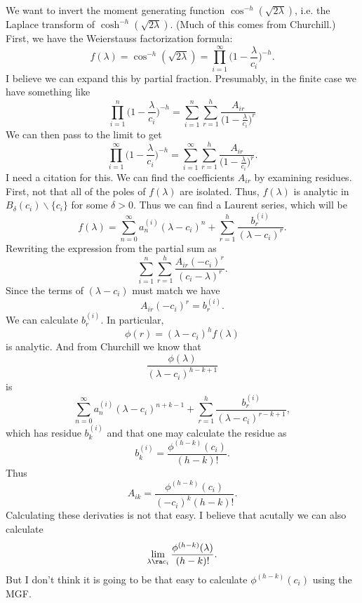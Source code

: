 \documentclass[12pt]{article}
\begin{document}
We want to invert the moment generating function $\cos^{-h}(\sqrt{2\lambda})$,
i.e. the Laplace transform of $\cosh^{-h}(\sqrt{2 \lambda})$.  (Much of this
comes from Churchill.)  First, we have the Weierstauss factorization formula:
\[
f(\lambda) = \cos^{-h}(\sqrt{2 \lambda}) = \prod_{i=1}^\infty \Big(1 -
\frac{\lambda}{c_i}\Big)^{-h}.
\]
I believe we can expand this by partial fraction.  Presumably, in the finite
case we have something like
\[
\prod_{i=1}^n \Big(1 - \frac{\lambda}{c_i}\Big)^{-h} = \sum_{i=1}^n \sum_{r=1}^h
\frac{A_{ir}}{\Big(1 - \frac{\lambda}{c_i}\Big)^{r}}
\]
We can then pass to the limit to get
\[
\prod_{i=1}^\infty \Big(1 - \frac{\lambda}{c_i}\Big)^{-h} = \sum_{i=1}^\infty \sum_{r=1}^h
\frac{A_{ir}}{\Big(1 - \frac{\lambda}{c_i}\Big)^r}.
\]
I need a citation for this.  We can find the coefficients $A_{ir}$ by examining
residues.  First, not that all of the poles of $f(\lambda)$ are isolated.  Thus,
$f(\lambda)$ is analytic in $B_{\delta}(c_i) \backslash \{c_i\}$ for some
$\delta > 0$.  Thus we can find a Laurent series, which will be
\[
f(\lambda) = \sum_{n=0}^\infty a_n^{(i)} (\lambda - c_i)^n + \sum_{r=1}^h
\frac{b_r^{(i)}}{(\lambda - c_i)^{r}}.
\]
Rewriting the expression from the partial sum as
\[
\sum_{i=1}^n \sum_{r=1}^h \frac{A_{ir} (-c_i)^r}{(c_i - \lambda)^r}.
\]
Since the terms of $(\lambda - c_i)$ must match we have
\[
A_{ir} (-c_i)^r = b_r^{(i)}.
\]
We can calculate $b_r^{(i)}$.  In particular,
\[
\phi(r) = (\lambda - c_i)^h f(\lambda)
\]
is analytic.  And from Churchill we know that
\[
\frac{\phi(\lambda)}{(\lambda-c_i)^{h-k+1}}
\]
is
\[
\sum_{n=0}^\infty a_n^{(i)} (\lambda - c_i)^{n+k-1} + \sum_{r=1}^h
\frac{b_r^{(i)}}{(\lambda - c_i)^{r-k+1}},
\]
which has residue $b_k^{(i)}$ and that one may calculate the residue as
\[
b_k^{(i)} = \frac{\phi^{(h-k)}(c_i)}{(h-k)!}.
\]
Thus
\[
A_{ik} = \frac{\phi^{(h-k)}(c_i)}{(-c_i)^k (h-k)!}.
\]
Calculating these derivaties is not that easy.  I believe that acutally we can
also calculate
\[
\lim_{\lambda \ra c_i} \frac{\phi^{(h-k)}(\lambda)}{(h-k)!}.
\]
But I don't think it is going to be that easy to calculate $\phi^{(h-k)}(c_i)$
using the MGF.
\end{document}
